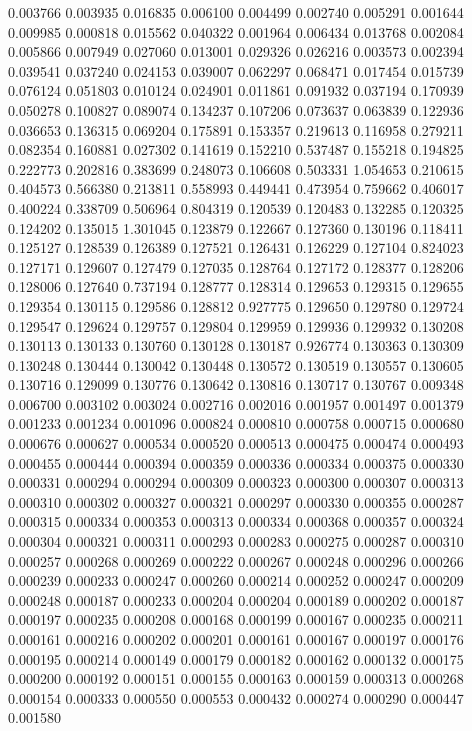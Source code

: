 0.003766
0.003935
0.016835
0.006100
0.004499
0.002740
0.005291
0.001644
0.009985
0.000818
0.015562
0.040322
0.001964
0.006434
0.013768
0.002084
0.005866
0.007949
0.027060
0.013001
0.029326
0.026216
0.003573
0.002394
0.039541
0.037240
0.024153
0.039007
0.062297
0.068471
0.017454
0.015739
0.076124
0.051803
0.010124
0.024901
0.011861
0.091932
0.037194
0.170939
0.050278
0.100827
0.089074
0.134237
0.107206
0.073637
0.063839
0.122936
0.036653
0.136315
0.069204
0.175891
0.153357
0.219613
0.116958
0.279211
0.082354
0.160881
0.027302
0.141619
0.152210
0.537487
0.155218
0.194825
0.222773
0.202816
0.383699
0.248073
0.106608
0.503331
1.054653
0.210615
0.404573
0.566380
0.213811
0.558993
0.449441
0.473954
0.759662
0.406017
0.400224
0.338709
0.506964
0.804319
0.120539
0.120483
0.132285
0.120325
0.124202
0.135015
1.301045
0.123879
0.122667
0.127360
0.130196
0.118411
0.125127
0.128539
0.126389
0.127521
0.126431
0.126229
0.127104
0.824023
0.127171
0.129607
0.127479
0.127035
0.128764
0.127172
0.128377
0.128206
0.128006
0.127640
0.737194
0.128777
0.128314
0.129653
0.129315
0.129655
0.129354
0.130115
0.129586
0.128812
0.927775
0.129650
0.129780
0.129724
0.129547
0.129624
0.129757
0.129804
0.129959
0.129936
0.129932
0.130208
0.130113
0.130133
0.130760
0.130128
0.130187
0.926774
0.130363
0.130309
0.130248
0.130444
0.130042
0.130448
0.130572
0.130519
0.130557
0.130605
0.130716
0.129099
0.130776
0.130642
0.130816
0.130717
0.130767
0.009348
0.006700
0.003102
0.003024
0.002716
0.002016
0.001957
0.001497
0.001379
0.001233
0.001234
0.001096
0.000824
0.000810
0.000758
0.000715
0.000680
0.000676
0.000627
0.000534
0.000520
0.000513
0.000475
0.000474
0.000493
0.000455
0.000444
0.000394
0.000359
0.000336
0.000334
0.000375
0.000330
0.000331
0.000294
0.000294
0.000309
0.000323
0.000300
0.000307
0.000313
0.000310
0.000302
0.000327
0.000321
0.000297
0.000330
0.000355
0.000287
0.000315
0.000334
0.000353
0.000313
0.000334
0.000368
0.000357
0.000324
0.000304
0.000321
0.000311
0.000293
0.000283
0.000275
0.000287
0.000310
0.000257
0.000268
0.000269
0.000222
0.000267
0.000248
0.000296
0.000266
0.000239
0.000233
0.000247
0.000260
0.000214
0.000252
0.000247
0.000209
0.000248
0.000187
0.000233
0.000204
0.000204
0.000189
0.000202
0.000187
0.000197
0.000235
0.000208
0.000168
0.000199
0.000167
0.000235
0.000211
0.000161
0.000216
0.000202
0.000201
0.000161
0.000167
0.000197
0.000176
0.000195
0.000214
0.000149
0.000179
0.000182
0.000162
0.000132
0.000175
0.000200
0.000192
0.000151
0.000155
0.000163
0.000159
0.000313
0.000268
0.000154
0.000333
0.000550
0.000553
0.000432
0.000274
0.000290
0.000447
0.001580
